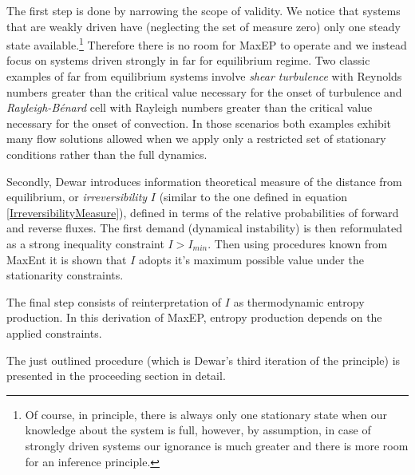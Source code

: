\documentclass[a4paper,12pt]{article}
\begin{document}
The first step is done by narrowing the scope of validity. We notice that systems that are weakly driven have (neglecting the set of measure zero) only one steady state available.\footnote{Of course, in principle, there is always only one stationary state when our knowledge about the system is full, however, by assumption, in case of strongly driven systems our ignorance is much greater and there is more room for an inference principle.} Therefore there is no room for MaxEP to operate and we instead focus on systems driven strongly in far for equilibrium regime.
Two classic examples of far from equilibrium systems involve \textit{shear turbulence} with Reynolds numbers greater than the critical value necessary for the onset of turbulence and \textit{Rayleigh-Bénard} cell with Rayleigh numbers greater than the critical value necessary for the onset of convection.
In those scenarios both examples exhibit many flow solutions allowed when we apply only a restricted set of stationary conditions rather than the full dynamics.

Secondly, Dewar introduces information theoretical measure of the distance from equilibrium, or \textit{irreversibility} $I$ (similar to the one defined in equation \ref{IrreversibilityMeasure}), defined in terms of the relative probabilities of forward and reverse fluxes. 
The first demand (dynamical instability) is then reformulated as a strong inequality constraint $I>I_{min}$. 
Then using procedures known from MaxEnt it is shown that $I$ adopts it's maximum possible value under the stationarity constraints.

The final step consists of reinterpretation of $I$ as thermodynamic entropy production. In this derivation of MaxEP, entropy production depends on the applied constraints.

The just outlined procedure (which is Dewar's third iteration of the principle) is presented in the proceeding section in detail.
\end{document}
